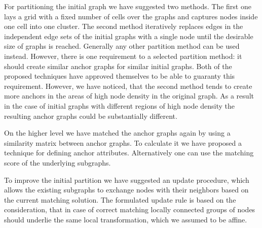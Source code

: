 For partitioning the initial graph we have suggested two methods. The first one lays a grid with a fixed number of cells over the graphs and captures nodes inside one cell into one cluster. The second method iteratively replaces edges in the independent edge sets of the initial graphs with a single node until the desirable size of graphs is reached. Generally any other partition method can be used instead. However, there is one requirement to a selected partition method: it should create similar anchor graphs for similar initial graphs. Both of the proposed techniques have approved themselves to be able to guaranty this requirement. However, we have noticed, that the second method tends to create more anchors in the areas of high node density in the original graph. As a result in the case of initial graphs with different regions of high node density the resulting anchor graphs could be substantially different.

On the higher level we have matched the anchor graphs again by using a similarity matrix between anchor graphs. To calculate it we have proposed a technique for defining anchor attributes. Alternatively one can use the matching score of the underlying subgraphs. 

To improve the initial partition we have suggested an update procedure, which allows the existing subgraphs to exchange nodes with their neighbors based on the current matching solution. The formulated update rule is based on the consideration, that in case of correct matching locally connected groups of nodes should underlie the same local transformation, which we assumed to be affine.

